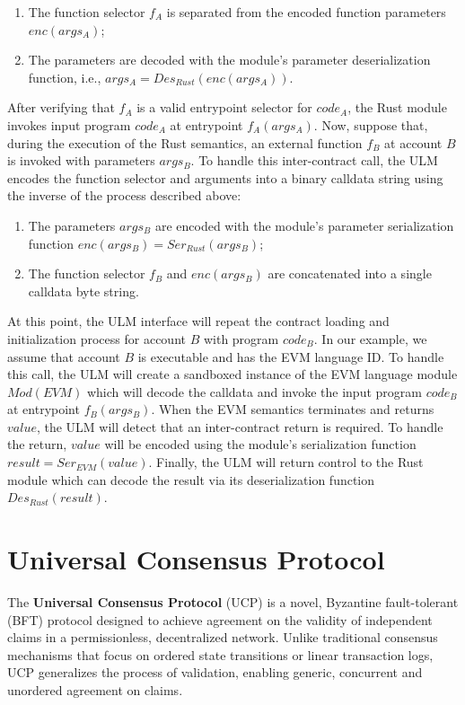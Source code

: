 \documentclass{article}
\newcommand{\ulm}{{ULM}}
\newcommand{\UniCon}{Universal Consensus Protocol}
\newcommand{\UC}{UCP}
\begin{document}
\begin{enumerate}
    \item The function selector $f_A$ is separated from the encoded function parameters $enc(args_A)$;
    \item The parameters are decoded with the module's parameter deserialization function, i.e., $args_A = Des_{Rust}(enc(args_A))$.
\end{enumerate}

After verifying that $f_A$ is a valid entrypoint selector for $code_A$, the Rust module invokes input program $code_A$ at entrypoint $f_A(args_A)$.
Now, suppose that, during the execution of the Rust semantics, an external function $f_B$ at account $B$ is invoked with parameters $args_B$.
To handle this inter-contract call, the \ulm{} encodes the function selector and arguments into a binary calldata string using the inverse of the process described above:

\begin{enumerate}
    \item The parameters $args_B$ are encoded with the module's parameter serialization function $enc(args_B) = Ser_{Rust}(args_B)$;
    \item The function selector $f_B$ and $enc(args_B)$ are concatenated into a single calldata byte string.
\end{enumerate}

At this point, the \ulm{} interface will repeat the contract loading and initialization process for account $B$ with program $code_B$.
In our example, we assume that account $B$ is executable and has the EVM language ID.
To handle this call, the \ulm{} will create a sandboxed instance of the EVM language module $Mod(EVM)$
which will decode the calldata and invoke the input program $code_B$ at entrypoint $f_B(args_B)$.
When the EVM semantics terminates and returns $value$, the \ulm{} will detect that an inter-contract return is required.
To handle the return, $value$ will be encoded using the module's serialization function $result = Ser_{EVM}(value)$.
Finally, the \ulm{} will return control to the Rust module which can decode the result via its deserialization function $Des_{Rust}(result)$.


\section{\UniCon}

The \textbf{\UniCon{}} (\UC{}) is a novel, Byzantine fault-tolerant (BFT) protocol designed to achieve agreement on the validity of independent claims in a permissionless, decentralized network. Unlike traditional consensus mechanisms that focus on ordered state transitions or linear transaction logs, \UC{} generalizes the process of validation, enabling generic, concurrent and unordered agreement on claims. 
\end{document}
